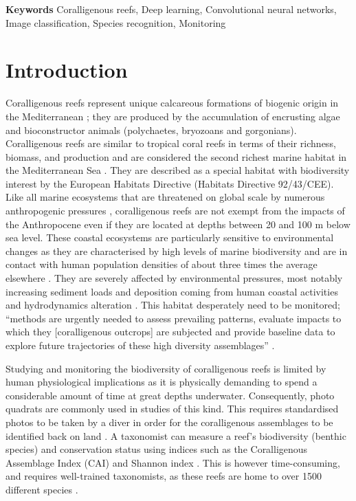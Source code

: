 \medskip

\noindent\textbf{Keywords}
Coralligenous reefs, Deep learning, Convolutional neural networks, Image classification, Species recognition, Monitoring

\section{Introduction}\label{chapitre1_1}
Coralligenous reefs represent unique calcareous formations of biogenic origin in the Mediterranean \citep{ballesteros_mediterranean_2006}; they are produced by the accumulation of encrusting algae and bioconstructor animals (polychaetes, bryozoans and gorgonians). Coralligenous reefs are similar to tropical coral reefs in terms of their richness, biomass, and production \citep{bianchi_biocostruzione_2001} and are considered the second richest marine habitat in the Mediterranean Sea \citep{boudouresque_marine_2004}. They are described as a special habitat with biodiversity interest by the European Habitats Directive (Habitats Directive 92/43/CEE). Like all marine ecosystems that are threatened on global scale by numerous anthropogenic pressures \citep{halpern_global_2008, hoekstra_confronting_2004}, coralligenous reefs are not exempt from the impacts of the Anthropocene \citep{mcgill_fifteen_2015} even if they are located at depths between 20 and 100 m below sea level. These coastal ecosystems are particularly sensitive to environmental changes as they are characterised by high levels of marine biodiversity \citep{halpern_global_2008} and are in contact with human population densities of about three times the average elsewhere \citep{small_global_2003}. They are severely affected by environmental pressures, most notably increasing sediment loads and deposition coming from human coastal activities and hydrodynamics alteration \citep{airoldi_effects_2003, ballesteros_mediterranean_2006}. This habitat desperately need to be monitored; “methods are urgently needed to assess prevailing patterns, evaluate impacts to which they [coralligenous outcrops] are subjected and provide baseline data to explore future trajectories of these high diversity assemblages” \citep{kipson_rapid_2011}.

Studying and monitoring the biodiversity of coralligenous reefs is limited by human physiological implications as it is physically demanding to spend a considerable amount of time at great depths underwater. Consequently, photo quadrats are commonly used in studies of this kind. This requires standardised photos to be taken by a diver in order for the coralligenous assemblages to be identified back on land \citep{deter_rapid_2012}. A taxonomist can measure a reef’s biodiversity (benthic species) and conservation status using indices such as the Coralligenous Assemblage Index (CAI) \citep{deter_preliminary_2012} and Shannon index \citep{magurran_measuring_2004}. This is however time-consuming, and requires well-trained taxonomists, as these reefs are home to over 1500 different species \citep{ballesteros_mediterranean_2006}. 

